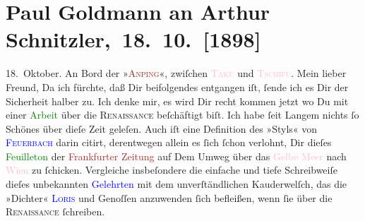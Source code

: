 

               \section[ Paul Goldmann an Arthur Schnitzler, 18. 10. {[}1898{]}]{Paul Goldmann an Arthur Schnitzler, 18. 10. {[}1898{]}}\nopagebreak{}\rehead{ }\normalsize\beginnumbering{} \toendnotes[C]{\smallbreak\pagebreak[2]} 
\toendnotes[C]{\smallbreak}\pstart
           \raggedleft{}{\pb}18. Oktober. An Bord der »\textsc{\textcolor{brown}{Anping}{}\ledrightnote{\textcolor{brown}{Anping Maru}}}«, zwiſchen \textsc{\textcolor{pink}{Taku}{}\ledrightnote{\textcolor{pink}{Taku Shi}}} und \textsc{\textcolor{pink}{Tschifu}{}\ledrightnote{\textcolor{pink}{Yantai}}}.\pend
           \pstart\center{}Mein lieber Freund,\pend\pstart
           Da ich fürchte, daß Dir beifolgendes \label{K_L02862-1v}\label{K_L02862-1h} entgangen iſt, ſende ich es Dir der Sicherheit halber
               zu. Ich denke mir, es wird Dir recht kommen jetzt wo Du mit einer \textcolor{green}{Arbeit}{} über die \textsc{Renaissance} beſchäftigt biſt. Ich habe ſeit Langem nichts ſo Schönes über
               dieſe Zeit geleſen. Auch iſt eine Definition des »Styls« von \textsc{\textcolor{blue}{Feuerbach}{}\ledrightnote{\textcolor{blue}{Anselm Feuerbach}}} darin citirt, derentwegen allein es ſich ſchon verlohnt, Dir dieſes \textcolor{green}{Feuilleton}{} der \textcolor{brown}{Frankfurter Zeitung}{}\ledrightnote{\textcolor{brown}{Frankfurter Zeitung}} auf Dem Umweg über das \textcolor{pink}{Gelbe Meer}{}\ledrightnote{\textcolor{pink}{Gelbes Meer}} nach \textcolor{pink}{Wien}{}\ledrightnote{\textcolor{pink}{Wien}} zu
               ſchicken. {\pb}Vergleiche insbeſondere die einfache und
               tiefe Schreibweiſe dieſes unbekannten \textcolor{blue}{Gelehrten}{} mit dem \strikeout{\textcolor{gray}{unv}} unverſtändlichen Kauderwelſch, das die »Dichter« \textsc{\textcolor{blue}{Loris}{}\ledrightnote{\textcolor{blue}{Hugo von Hofmannsthal}}} und Genoſſen anzuwenden ſich befleißen, wenn ſie über die \textsc{Renaissance} ſchreiben.\pend
